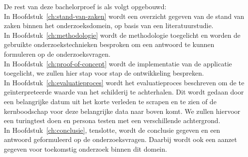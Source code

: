 
De rest van deze bachelorproef is als volgt opgebouwd: \\

In Hoofdstuk~\ref{ch:stand-van-zaken} wordt een overzicht gegeven van de stand van zaken binnen het onderzoeksdomein, op basis van een literatuurstudie. \\
In Hoofdstuk~\ref{ch:methodologie} wordt de methodologie toegelicht en worden de gebruikte onderzoekstechnieken besproken om een antwoord te kunnen formuleren op de onderzoeksvragen. \\
In Hoofdstuk~\ref{ch:proof-of-concept} wordt de implementatie van de applicatie toegelicht, we zullen hier stap voor stap de ontwikkeling bespreken. \\
In Hoofdstuk~\ref{ch:evaluatieproces} wordt het evaluatieproces beschreven om de te geïnterpreteerde waarde van het schilderij te achterhalen. Dit wordt gedaan door een belangrijke datum uit het korte verleden te scrapen en te zien of de kernboodschap voor deze belangrijke data naar boven komt. We zullen hiervoor een turingtest doen en persona testen met een verschillende achtergrond.\\
In Hoofdstuk~\ref{ch:conclusie}, tenslotte, wordt de conclusie gegeven en een antwoord geformuleerd op de onderzoeksvragen. Daarbij wordt ook een aanzet gegeven voor toekomstig onderzoek binnen dit domein.